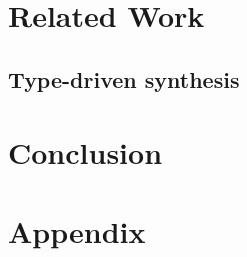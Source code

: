 \documentclass[sigplan,10pt]{acmart}
\theoremstyle{mytheoremstyle}
\begin{document}
\section{Related Work}


\subsection{Type-driven synthesis}


\section{Conclusion}






\newpage
\section{Appendix}
\end{document}
